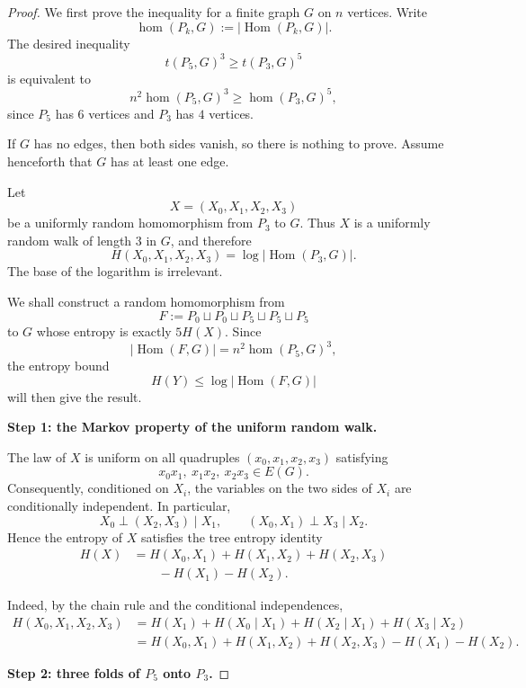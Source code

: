 \documentclass[11pt]{article}
\DeclareMathOperator{\Hom}{Hom}
\begin{document}
\begin{proof}
We first prove the inequality for a finite graph $G$ on $n$ vertices.
Write
\[
    \hom(P_k,G):=|\Hom(P_k,G)|.
\]
The desired inequality
\[
    t(P_5,G)^3\ge t(P_3,G)^5
\]
is equivalent to
\[
    n^2 \hom(P_5,G)^3\ge \hom(P_3,G)^5,
\]
since $P_5$ has $6$ vertices and $P_3$ has $4$ vertices.

If $G$ has no edges, then both sides vanish, so there is nothing to prove.
Assume henceforth that $G$ has at least one edge.

Let
\[
    X=(X_0,X_1,X_2,X_3)
\]
be a uniformly random homomorphism from $P_3$ to $G$.
Thus $X$ is a uniformly random walk of length $3$ in $G$, and therefore
\[
    H(X_0,X_1,X_2,X_3)
    =
    \log |\Hom(P_3,G)|.
\]
The base of the logarithm is irrelevant.

We shall construct a random homomorphism from
\[
    F:=P_0\sqcup P_0\sqcup P_5\sqcup P_5\sqcup P_5
\]
to $G$ whose entropy is exactly $5H(X)$.
Since
\[
    |\Hom(F,G)|
    =
    n^2\hom(P_5,G)^3,
\]
the entropy bound
\[
    H(Y)\le \log|\Hom(F,G)|
\]
will then give the result.

\medskip

\noindent
\textbf{Step 1: the Markov property of the uniform random walk.}

The law of $X$ is uniform on all quadruples
$(x_0,x_1,x_2,x_3)$ satisfying
\[
    x_0x_1,\ x_1x_2,\ x_2x_3\in E(G).
\]
Consequently, conditioned on $X_i$, the variables on the two sides of
$X_i$ are conditionally independent.  In particular,
\[
    X_0 \perp (X_2,X_3)\mid X_1,
    \qquad
    (X_0,X_1)\perp X_3\mid X_2.
\]
Hence the entropy of $X$ satisfies the tree entropy identity
\begin{equation}\label{eq:tree-entropy-P3}
\begin{aligned}
    H(X)
    &=
    H(X_0,X_1)
    +H(X_1,X_2)
    +H(X_2,X_3)  \\
    &\qquad
    -H(X_1)-H(X_2).
\end{aligned}
\end{equation}

Indeed, by the chain rule and the conditional independences,
\[
\begin{aligned}
H(X_0,X_1,X_2,X_3)
&=
H(X_1)
+H(X_0\mid X_1)
+H(X_2\mid X_1)
+H(X_3\mid X_2) \\
&=
H(X_0,X_1)+H(X_1,X_2)+H(X_2,X_3)
-H(X_1)-H(X_2).
\end{aligned}
\]

\medskip

\noindent
\textbf{Step 2: three folds of $P_5$ onto $P_3$.}


\end{proof}
\end{document}
